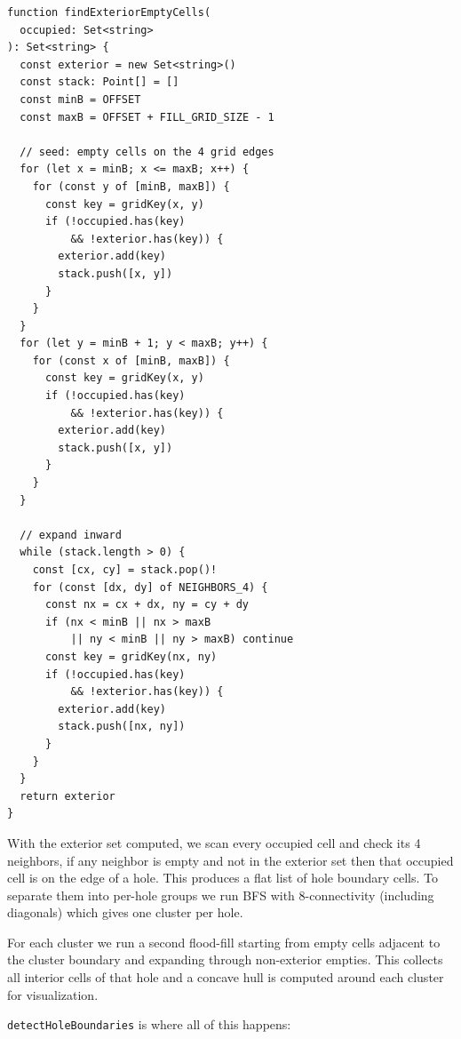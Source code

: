 \documentclass[12pt]{extreport}
\begin{document}
\begin{lstlisting}[style=tsstyle, caption={Exterior flood-fill (\texttt{grid.ts})}]
function findExteriorEmptyCells(
  occupied: Set<string>
): Set<string> {
  const exterior = new Set<string>()
  const stack: Point[] = []
  const minB = OFFSET
  const maxB = OFFSET + FILL_GRID_SIZE - 1

  // seed: empty cells on the 4 grid edges
  for (let x = minB; x <= maxB; x++) {
    for (const y of [minB, maxB]) {
      const key = gridKey(x, y)
      if (!occupied.has(key)
          && !exterior.has(key)) {
        exterior.add(key)
        stack.push([x, y])
      }
    }
  }
  for (let y = minB + 1; y < maxB; y++) {
    for (const x of [minB, maxB]) {
      const key = gridKey(x, y)
      if (!occupied.has(key)
          && !exterior.has(key)) {
        exterior.add(key)
        stack.push([x, y])
      }
    }
  }

  // expand inward
  while (stack.length > 0) {
    const [cx, cy] = stack.pop()!
    for (const [dx, dy] of NEIGHBORS_4) {
      const nx = cx + dx, ny = cy + dy
      if (nx < minB || nx > maxB
          || ny < minB || ny > maxB) continue
      const key = gridKey(nx, ny)
      if (!occupied.has(key)
          && !exterior.has(key)) {
        exterior.add(key)
        stack.push([nx, ny])
      }
    }
  }
  return exterior
}
\end{lstlisting}

With the exterior set computed, we scan every occupied cell and check its 4 neighbors, if any neighbor is empty and not in the exterior set then that occupied cell is on the edge of a hole. This produces a flat list of hole boundary cells. To separate them into per-hole groups we run BFS with 8-connectivity (including diagonals) which gives one cluster per hole.

For each cluster we run a second flood-fill starting from empty cells adjacent to the cluster boundary and expanding through non-exterior empties. This collects all interior cells of that hole and a concave hull is computed around each cluster for visualization.

\texttt{detectHoleBoundaries} is where all of this happens:
\end{document}
